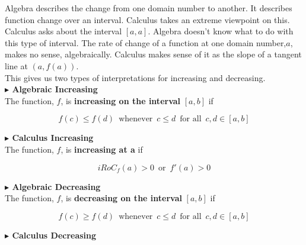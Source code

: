 \documentclass{ximera}
\begin{document}
Algebra describes the change from one domain number to another. It describes function change over an interval. Calculus takes an extreme viewpoint on this.  Calculus asks about the interval $[a,a]$. Algebra doesn't know what to do with this type of interval. The rate of change of a function at one domain number,$a$, makes no sense, algebraically. Calculus makes sense of it as the slope of a tangent line at $(a, f(a))$. \\

This gives us two types of interpretations for increasing and decreasing. \\


\textbf{\textcolor{red!80!black}{$\blacktriangleright$ Algebraic Increasing}} \\



The function, $f$, is \textbf{\textcolor{purple!85!blue}{increasing on the interval}} $[a, b]$ if


\[
f(c) \leq f(d) \, \text{ whenever } \, c \leq d \, \text{ for all } \, c, d \in [a,b]
\]









\textbf{\textcolor{red!80!black}{$\blacktriangleright$ Calculus Increasing}} \\



The function, $f$, is \textbf{\textcolor{purple!85!blue}{increasing at a}} if


\[
iRoC_f(a) > 0 \, \text{ or } \, f'(a) > 0
\]










\textbf{\textcolor{red!80!black}{$\blacktriangleright$ Algebraic Decreasing}} \\



The function, $f$, is \textbf{\textcolor{purple!85!blue}{decreasing on the interval}} $[a, b]$ if


\[
f(c) \geq f(d) \, \text{ whenever } \, c \leq d \, \text{ for all } \, c, d \in [a,b]
\]









\textbf{\textcolor{red!80!black}{$\blacktriangleright$ Calculus Decreasing}} \\
\end{document}
